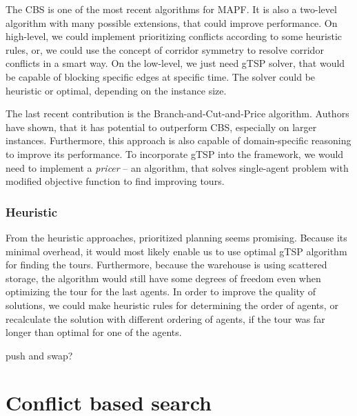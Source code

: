 The CBS is one of the most recent algorithms for MAPF. It is also a two-level algorithm with many possible extensions, that could improve performance. On high-level, we could implement prioritizing conflicts according to some heuristic rules, or, we could use the concept of corridor symmetry to resolve corridor conflicts in a smart way\cite{li2020}. On the low-level, we just need gTSP solver, that would be capable of blocking specific edges at specific time. The solver could be heuristic or optimal, depending on the instance size. 
\par

The last recent contribution is the Branch-and-Cut-and-Price algorithm. Authors have shown, that it has potential to outperform CBS, especially on larger instances. Furthermore, this approach is also capable of domain-specific reasoning to improve its performance. To incorporate gTSP into the framework, we would need to implement a \emph{pricer} -- an algorithm, that solves single-agent problem with modified objective function to find improving tours.


\subsubsection{Heuristic}
From the heuristic approaches, prioritized planning seems promising. Because its minimal overhead, it would most likely enable us to use optimal gTSP algorithm for finding the tours. Furthermore, because the warehouse is using scattered storage, the algorithm would still have some degrees of freedom even when optimizing the tour for the last agents. In order to improve the quality of solutions, we could make heuristic rules for determining the order of agents, or recalculate the solution with different ordering of agents, if the tour was far longer than optimal for one of the agents.
\par
push and swap?






\section{Conflict based search}


